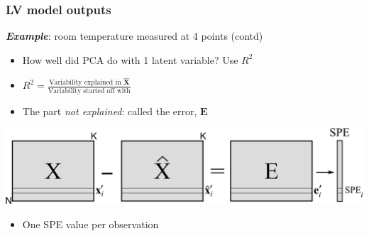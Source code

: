 \begin{frame}\frametitle{LV model outputs}

	\textbf{\emph{Example}}: room temperature measured at 4 points (contd)
	
	\begin{itemize}
		
		\item	How well did PCA do with 1 latent variable? Use \( R^2 \)
		
		\item	\vspace{6pt}\( R^2 = \frac{\displaystyle\text{Variability explained in}\,\, \hat{\mathbf{X}}}{\displaystyle \text{Variability started off with}} \) \vspace{6pt}
		
		\item	The part \emph{not explained}: called the error, \( \mathbf{E} \)
	\end{itemize}
	
	\begin{center}
		\includegraphics[width=\textwidth]{images/SPE-illustration.png}
	\end{center}

	\begin{itemize}
		\item	One SPE value per observation
	\end{itemize}
	
\end{frame}

